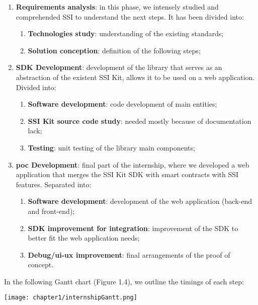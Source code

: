 \begin{enumerate}
    \item \textbf{Requirements analysis}: in this phase, we intensely studied and 
    comprehended SSI to understand the next steps. It has been divided into:
    \vspace*{-0.1cm}
    \begin{enumerate}
        \setlength\itemsep{-0.1em}
        \item \textbf{Technologies study}: understanding of the existing standards;
        \item \textbf{Solution conception}: definition of the following steps;
    \end{enumerate}
    \vspace*{0.1cm}
    \item \textbf{SDK Development}: development of the library that serves as 
    an abstraction of the existent SSI Kit, allows it to be used on a web application.
    Divided into:
    \vspace*{-0.1cm}
    \begin{enumerate}
        \setlength\itemsep{-0.1em}
        \item \textbf{Software development}: code development of main entities;
        \item \textbf{SSI Kit source code study}: needed mostly because of 
        documentation lack;
        \item \textbf{Testing}: unit testing of the library main components;
    \end{enumerate}
    \vspace*{0.1cm}
    \item \textbf{\acrshort{poc} Development}: final part of the internship, where we
    developed a web application that merges the SSI Kit SDK with smart contracts
    with SSI features. Separated into:
    \vspace*{-0.1cm}
    \begin{enumerate}
        \setlength\itemsep{-0.1em}
        \item \textbf{Software development}: development of the web application (back-end and
        front-end);
        \item \textbf{SDK improvement for integration}: improvement of the SDK to better 
        fit the web application needs;
        \item \textbf{Debug/\acrshort{ui}-\acrshort{ux} improvement}: final arrangements of the proof of concept.
    \end{enumerate}
\end{enumerate}
\clearpage
In the following Gantt chart (Figure 1.4), we outline the timings of each step:
\begin{center}
    \hspace*{-1cm}
    \texttt{[image: chapter1/internshipGantt.png]}
\end{center}
